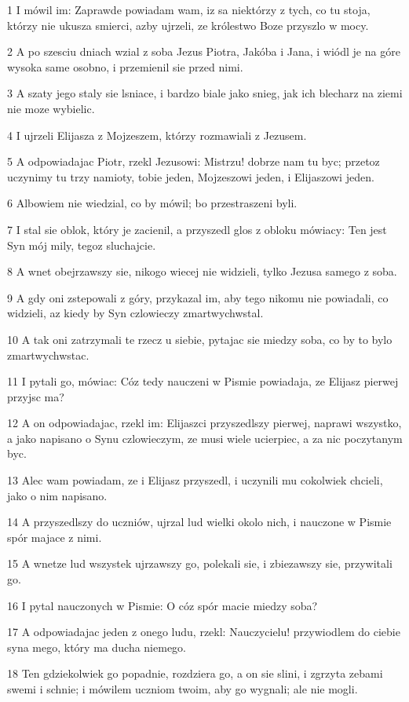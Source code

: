 \par 1 I mówil im: Zaprawde powiadam wam, iz sa niektórzy z tych, co tu stoja, którzy nie ukusza smierci, azby ujrzeli, ze królestwo Boze przyszlo w mocy.
\par 2 A po szesciu dniach wzial z soba Jezus Piotra, Jakóba i Jana, i wiódl je na góre wysoka same osobno, i przemienil sie przed nimi.
\par 3 A szaty jego staly sie lsniace, i bardzo biale jako snieg, jak ich blecharz na ziemi nie moze wybielic.
\par 4 I ujrzeli Elijasza z Mojzeszem, którzy rozmawiali z Jezusem.
\par 5 A odpowiadajac Piotr, rzekl Jezusowi: Mistrzu! dobrze nam tu byc; przetoz uczynimy tu trzy namioty, tobie jeden, Mojzeszowi jeden, i Elijaszowi jeden.
\par 6 Albowiem nie wiedzial, co by mówil; bo przestraszeni byli.
\par 7 I stal sie oblok, który je zacienil, a przyszedl glos z obloku mówiacy: Ten jest Syn mój mily, tegoz sluchajcie.
\par 8 A wnet obejrzawszy sie, nikogo wiecej nie widzieli, tylko Jezusa samego z soba.
\par 9 A gdy oni zstepowali z góry, przykazal im, aby tego nikomu nie powiadali, co widzieli, az kiedy by Syn czlowieczy zmartwychwstal.
\par 10 A tak oni zatrzymali te rzecz u siebie, pytajac sie miedzy soba, co by to bylo zmartwychwstac.
\par 11 I pytali go, mówiac: Cóz tedy nauczeni w Pismie powiadaja, ze Elijasz pierwej przyjsc ma?
\par 12 A on odpowiadajac, rzekl im: Elijaszci przyszedlszy pierwej, naprawi wszystko, a jako napisano o Synu czlowieczym, ze musi wiele ucierpiec, a za nic poczytanym byc.
\par 13 Alec wam powiadam, ze i Elijasz przyszedl, i uczynili mu cokolwiek chcieli, jako o nim napisano.
\par 14 A przyszedlszy do uczniów, ujrzal lud wielki okolo nich, i nauczone w Pismie spór majace z nimi.
\par 15 A wnetze lud wszystek ujrzawszy go, polekali sie, i zbiezawszy sie, przywitali go.
\par 16 I pytal nauczonych w Pismie: O cóz spór macie miedzy soba?
\par 17 A odpowiadajac jeden z onego ludu, rzekl: Nauczycielu! przywiodlem do ciebie syna mego, który ma ducha niemego.
\par 18 Ten gdziekolwiek go popadnie, rozdziera go, a on sie slini, i zgrzyta zebami swemi i schnie; i mówilem uczniom twoim, aby go wygnali; ale nie mogli.
